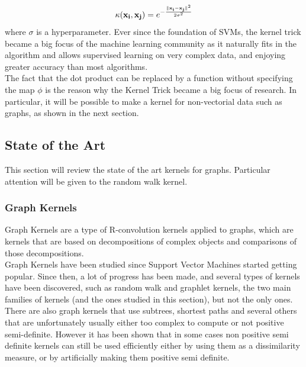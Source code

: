 \documentclass{article}
\DeclarePairedDelimiter{\norm}{\lVert}{\rVert}
\let\vec\mathbf
\theoremstyle{definition}
\begin{document}
\begin{equation}
	\label{eq:rbf}
	\kappa(\vec{x_{i}},\vec{x_{j}})={e}^{-\frac{\norm{\vec{x_{i}}-\vec{x_{j}}}^{2}}{2\sigma^{2}}}
\end{equation}
where $\sigma$ is a hyperparameter.
Ever since the foundation of SVMs, the kernel trick became a big focus of the machine learning community as it naturally fits in the algorithm and allows supervised learning on very complex data, and enjoying greater accuracy than most algorithms.\\
The fact that the dot product can be replaced by a function without specifying the map $\phi$ is the reason why the Kernel Trick became a big focus of research. In particular, it will be possible to make a kernel for non-vectorial data such as graphs, as shown in the next section. 
\subsection{State of the Art}
This section will review the state of the art kernels for graphs. Particular attention will be given to the random walk kernel.
\subsubsection{Graph Kernels}
Graph Kernels are a type of R-convolution kernels\cite{haussler99convolution} applied to graphs, which are kernels that are based on decompositions of complex objects and comparisons of those decompositions.\\
Graph Kernels have been studied since Support Vector Machines started getting popular\cite{kashima_graphkers_2003}. Since then, a lot of progress has been made, and several types of kernels have been discovered, such as random walk and graphlet\cite{shervashidze_efficient_2009} kernels, the two main families of kernels (and the ones studied in this section), but not the only ones.
There are also graph kernels that use subtrees\cite{ramon2003expressivity}, shortest paths\cite{borgwardt2005shortest} and several others that are unfortunately usually  either too complex to compute or not positive semi-definite\cite{shervashidze2012scalable}. However it has been shown\cite{schlkopf_learning_2001} that in some cases non positive semi definite kernels can still be used efficiently either by using them as a dissimilarity measure, or by artificially making them positive semi definite.
\end{document}
